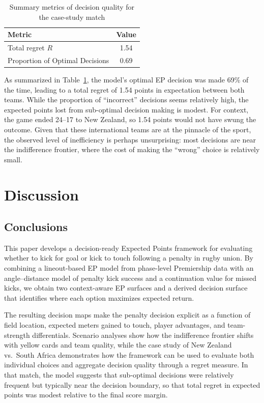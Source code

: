 \documentclass[12pt]{article}
\begin{document}
\begin{table}[htbp]
\centering
\caption{Summary metrics of decision quality for the case-study match}
\label{tab:summary_metrics}
\begin{tabular}{lc}
\hline
Metric & Value \\
\hline
Total regret $R$ & 1.54 \\
Proportion of Optimal Decisions & 0.69 \\
\hline
\end{tabular}
\end{table}

As summarized in Table~\ref{tab:summary_metrics}, the model’s optimal EP decision was made 69\% of the time, leading to a total regret of 1.54 points in expectation between both teams. While the proportion of ``incorrect'' decisions seems relatively high, the expected points lost from sub-optimal decision making is modest. For context, the game ended 24--17 to New Zealand, so 1.54 points would not have swung the outcome. Given that these international teams are at the pinnacle of the sport, the observed level of inefficiency is perhaps unsurprising: most decisions are near the indifference frontier, where the cost of making the ``wrong'' choice is relatively small.

\section{Discussion}

\subsection{Conclusions}

This paper develops a decision-ready Expected Points framework for evaluating whether to kick for goal or kick to touch following a penalty in rugby union. By combining a lineout-based EP model from phase-level Premiership data with an angle--distance model of penalty kick success and a continuation value for missed kicks, we obtain two context-aware EP surfaces and a derived decision surface that identifies where each option maximizes expected return.

The resulting decision maps make the penalty decision explicit as a function of field location, expected meters gained to touch, player advantages, and team-strength differentials. Scenario analyses show how the indifference frontier shifts with yellow cards and team quality, while the case study of New Zealand vs.\ South Africa demonstrates how the framework can be used to evaluate both individual choices and aggregate decision quality through a regret measure. In that match, the model suggests that sub-optimal decisions were relatively frequent but typically near the decision boundary, so that total regret in expected points was modest relative to the final score margin.
\end{document}
